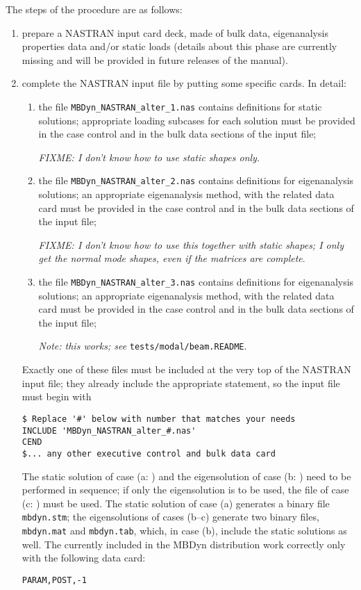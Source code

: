 The steps of the procedure are as follows:
\begin{enumerate} %

\item prepare a NASTRAN input card deck, made of bulk data,
eigenanalysis properties data and/or static loads (details about 
this phase are currently missing and will be provided in future 
releases of the manual).

\item complete the NASTRAN input file by putting some specific
 cards.
In detail:
\begin{enumerate}
\item the file \texttt{MBDyn\_NASTRAN\_alter\_1.nas} contains
	 definitions for static solutions; appropriate
	loading subcases for each solution must be provided
	in the case control and in the bulk data sections
	of the input file;

	\emph{FIXME: I don't know how to use static shapes only}.

\item the file \texttt{MBDyn\_NASTRAN\_alter\_2.nas} contains
	 definitions for eigenanalysis solutions;
	an appropriate eigenanalysis method, with the related
	data card must be provided in the case control 
	and in the bulk data sections of the input file;

	\emph{FIXME: I don't know how to use this together
		with static shapes; I only get the normal mode shapes,
		even if the matrices are complete}.

\item the file \texttt{MBDyn\_NASTRAN\_alter\_3.nas} contains
	 definitions for eigenanalysis solutions;
	an appropriate eigenanalysis method, with the related
	data card must be provided in the case control 
	and in the bulk data sections of the input file;

	\emph{Note: this works; see} \texttt{tests/modal/beam.README}.

\end{enumerate}
Exactly one of these files must be included at the very top 
of the NASTRAN input file;
they already include the appropriate  statement, so the
input file must begin with
\begin{verbatim}
$ Replace '#' below with number that matches your needs
INCLUDE 'MBDyn_NASTRAN_alter_#.nas'
CEND
$... any other executive control and bulk data card
\end{verbatim}
The static solution of case (a: ) and the eigensolution
of case (b: ) need to be performed in sequence; 
if only the eigensolution is to be used, the  file 
of case (c: ) must be used.
The static solution of case (a) generates a binary file \texttt{mbdyn.stm};
the eigensolutions of cases (b--c) generate two binary files, 
\texttt{mbdyn.mat} and \texttt{mbdyn.tab}, which, in case (b), include
the static solutions as well.
The  currently included in the MBDyn distribution work 
correctly only with the following  data card:
\begin{verbatim}
PARAM,POST,-1 
\end{verbatim}



\end{enumerate}
